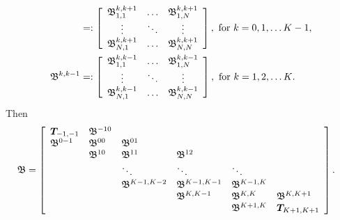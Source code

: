 \begin{align*}
%
&=:\left[\begin{array}{ccc} {  {\mathfrak{\bs B}}}^{k,k+1}_{1,1}& \hdots &  {  {\mathfrak{\bs B}}}^{k,k+1}_{1,N}\\  \vdots &\ddots & \vdots \\  {  {\mathfrak{\bs B}}}^{k,k+1}_{N,1} & \hdots & {  {\mathfrak{\bs B}}}^{k,k+1}_{N,N} \end{array}\right],\mbox{ for \(k=0,1,\dots K-1\),}
%
\\ {  {\mathfrak{\bs B}}}^{k,k-1}%
%
&=:\left[\begin{array}{ccc} {  {\mathfrak{\bs B}}}^{k,k-1}_{1,1}& \hdots &  {  {\mathfrak{\bs B}}}^{k,k-1}_{1,N}\\  \vdots &\ddots & \vdots \\  {  {\mathfrak{\bs B}}}^{k,k-1}_{N,1} & \hdots & {  {\mathfrak{\bs B}}}^{k,k-1}_{N,N} \end{array}\right], \mbox{ for \(k=1,2,\dots K\).}
\end{align*} 
Then
\begin{align*}
{  {\mathfrak{\boldsymbol B}}} &= \left[\begin{array}{llllll}
	\boldsymbol T_{{-1},{-1}}&  {  {\mathfrak{\boldsymbol B}}}^{{-1}0} & & & & \\
	 {  {\mathfrak{\boldsymbol B}}}^{0{-1}} &  {  {\mathfrak{\boldsymbol B}}}^{00} &  {  {\mathfrak{\boldsymbol B}}}^{01} & & & \\
	&  {  {\mathfrak{\boldsymbol B}}}^{10} &  {  {\mathfrak{\boldsymbol B}}}^{11} &  {  {\mathfrak{\boldsymbol B}}}^{12} & & \\
	& & \ddots & \ddots & \ddots & \\
	& &  {   {\mathfrak{\boldsymbol B}}}^{K-1,K-2} & {   {\mathfrak{\boldsymbol B}}}^{K-1,K-1} &  {  {\mathfrak{\boldsymbol B}}}^{K-1,K} & \\
	& & & {   {\mathfrak{\boldsymbol B}}}^{K,K-1} &  {  {\mathfrak{\boldsymbol B}}}^{K,K} &  {  {\mathfrak{\boldsymbol B}}}^{K,{K+1}} \\
	& & & &  {  {\mathfrak{\boldsymbol B}}}^{{K+1}, K} & \boldsymbol T_{{K+1},{K+1}}
\end{array}\right].\end{align*}

